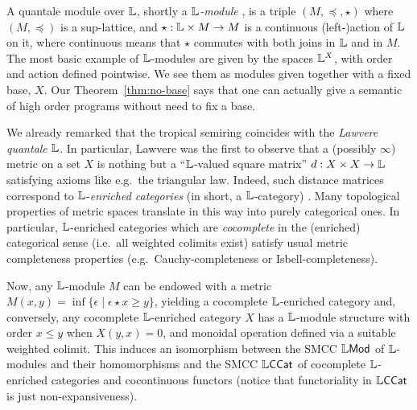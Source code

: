\documentclass[submission,%
]{eptcs}
\begin{document}
A quantale module over $\mathbb{L}$, shortly a \emph{$\mathbb{L}$-module}%
, is a triple  $(M,\preceq, \star)$ where $(M, \preceq)$ is a sup-lattice, and $\star: \mathbb{L} \times M \to M$ is a continuous (left-)action of $\mathbb{L}$ on it, where continuous means that $\star$ commutes with both joins in $\mathbb{L}$ and in $M$. 
The most basic example of $\mathbb{L}$-modules are given by the spaces $\mathbb{L}^{X}$, with order and action defined pointwise.
We see them as modules given together with a fixed base, $X$.
Our Theorem~\ref{thm:no-base} says that one can actually give a semantic of high order programs without need to fix a base.



We already remarked that the tropical semiring coincides with the \emph{Lawvere quantale} $\mathbb{L}$.
In particular, Lawvere was the first to observe that a (possibly $\infty$) metric on a set $X$ is nothing but a ``$\mathbb{L}$-valued square matrix'' $d:X\times X\to \mathbb{L}$ satisfying axioms like e.g.~the triangular law.
Indeed, such distance matrices correspond to $\mathbb{L}$-\emph{enriched categories} (in short, a $\mathbb{L}$-category) \cite{Lawvere1973, Hofmann2014, Stubbe2014}.
Many topological properties of metric spaces translate in this way into purely categorical ones. In particular, $\mathbb{L}$-enriched categories which are \emph{cocomplete} in the (enriched) categorical sense (i.e.~all weighted colimits exist) satisfy usual metric completeness properties (e.g.~Cauchy-completeness or Isbell-completeness). 

Now, any $\mathbb{L}$-module $M$ can be endowed with a metric 
$M(x,y)=\inf\{\epsilon \mid \epsilon \star x \geq y\}$, yielding a cocomplete $\mathbb{L}$-enriched category and, conversely, any cocomplete $\mathbb{L}$-enriched category $X$ has a $\mathbb{L}$-module structure with order $x\leq y$ when $X(y,x)=0$, and monoidal operation defined via a suitable weighted colimit.
This induces an isomorphism between the SMCC $\mathbb{L}\mathsf{Mod}$ of $\mathbb{L}$-modules and their homomorphisms and the SMCC $\mathbb{L}\mathsf{CCat}$ of cocomplete $\mathbb{L}$-enriched categories and cocontinuous functors (notice that functoriality in $\mathbb{L}\mathsf{CCat}$ is just non-expansiveness). 


%
%
\end{document}
